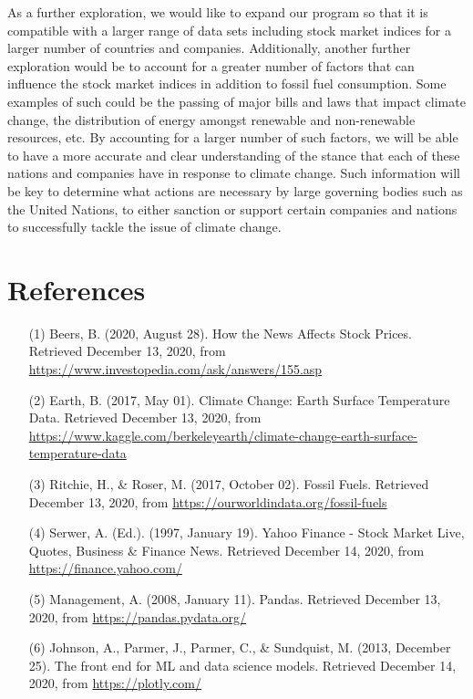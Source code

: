 \documentclass[fontsize=11pt]{article}
\begin{document}
As a further exploration, we would like to expand our program so that it is compatible with a larger range of data sets including stock market indices for a larger number of countries and companies. Additionally, another further exploration would be to account for a greater number of factors that can influence the stock market indices in addition to fossil fuel consumption. Some examples of such could be the passing of major bills and laws that impact climate change, the distribution of energy amongst renewable and non-renewable resources, etc. By accounting for a larger number of such factors, we will be able to have a more accurate and clear understanding of the stance that each of these nations and companies have in response to climate change. Such information will be key to determine what actions are necessary by large governing bodies such as the United Nations, to either sanction or support certain companies and nations to successfully tackle the issue of climate change.\\

\vspace{\baselineskip}
\section*{References}\par


\begin{enumerate}

    \item[(1)] Beers, B. (2020, August 28). How the News Affects Stock Prices. Retrieved December 13, 2020, from \url{https://www.investopedia.com/ask/answers/155.asp}

    \item[(2)] Earth, B. (2017, May 01). Climate Change: Earth Surface
    Temperature Data. Retrieved December 13, 2020, from \url{https://www.kaggle.com/berkeleyearth/climate-change-earth-surface-temperature-data}

    \item[(3)] Ritchie, H., \& Roser, M. (2017, October 02). Fossil Fuels. Retrieved December 13, 2020, from \url{https://ourworldindata.org/fossil-fuels}

    \item[(4)] Serwer, A. (Ed.). (1997, January 19). Yahoo Finance - Stock Market Live, Quotes, Business \& Finance News. Retrieved December 14, 2020, from \url{https://finance.yahoo.com/}

    \item[(5)] Management, A. (2008, January 11). Pandas. Retrieved December 13, 2020, from \url{https://pandas.pydata.org/}

    \item[(6)] Johnson, A., Parmer, J., Parmer, C., \& Sundquist, M. (2013, December 25). The front end for ML and data science models. Retrieved December 14, 2020, from \url{https://plotly.com/}

\end{enumerate}
\end{document}
